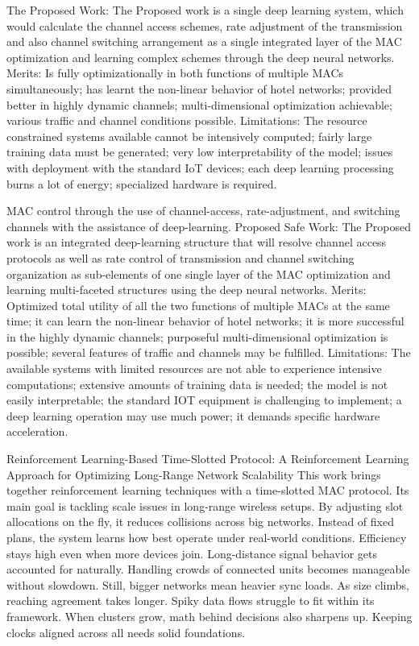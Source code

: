 \documentclass[a4paper,fleqn]{cas-dc}
\numberwithin{equation}{section}
\begin{document}
The Proposed Work: The Proposed work is a single deep learning system, which would calculate the channel access schemes, rate adjustment of the transmission and also channel switching arrangement as a single integrated layer of the MAC optimization and learning complex schemes through the deep neural networks. Merits: Is fully optimizationally in both functions of multiple MACs simultaneously; has learnt the non-linear behavior of hotel networks; provided better in highly dynamic channels; multi-dimensional optimization achievable; various traffic and channel conditions possible. Limitations: The resource constrained systems available cannot be intensively computed; fairly large training data must be generated; very low interpretability of the model; issues with deployment with the standard IoT devices; each deep learning processing burns a lot of energy; specialized hardware is required.\cite{Bandara2025}

MAC control through the use of channel-access, rate-adjustment, and switching channels with the assistance of deep-learning.
Proposed Safe Work: The Proposed work is an integrated deep-learning structure that will resolve channel access protocols as well as rate control of transmission and channel switching organization as sub-elements of one single layer of the MAC optimization and learning multi-faceted structures using the deep neural networks. Merits: Optimized total utility of all the two functions of multiple MACs at the same time; it can learn the non-linear behavior of hotel networks; it is more successful in the highly dynamic channels; purposeful multi-dimensional optimization is possible; several features of traffic and channels may be fulfilled. Limitations: The available systems with limited resources are not able to experience intensive computations; extensive amounts of training data is needed; the model is not easily interpretable; the standard IOT equipment is challenging to implement; a deep learning operation may use much power; it demands specific hardware acceleration\cite{Alhattab2025}.

Reinforcement Learning-Based Time-Slotted Protocol: A Reinforcement Learning Approach for Optimizing Long-Range Network Scalability
This work brings together reinforcement learning techniques with a time-slotted MAC protocol. Its main goal is tackling scale issues in long-range wireless setups. By adjusting slot allocations on the fly, it reduces collisions across big networks. Instead of fixed plans, the system learns how best operate under real-world conditions. Efficiency stays high even when more devices join. Long-distance signal behavior gets accounted for naturally. Handling crowds of connected units becomes manageable without slowdown. Still, bigger networks mean heavier sync loads. As size climbs, reaching agreement takes longer. Spiky data flows struggle to fit within its framework. When clusters grow, math behind decisions also sharpens up. Keeping clocks aligned across all needs solid foundations.
\end{document}
